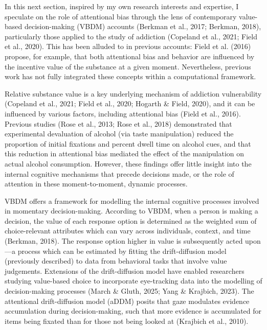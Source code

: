 \documentclass[authordate, empirical]{jote-new-article}
\begin{document}
	In this next section, inspired by my own research interests and expertise, I speculate on the role of attentional bias through the lens of contemporary value-based decision-making (VBDM) accounts (Berkman et al., 2017; Berkman, 2018), particularly those applied to the study of addiction (Copeland et al., 2021; Field et al., 2020). This has been alluded to in previous accounts: Field et al. (2016) propose, for example, that both attentional bias and behavior are influenced by the incentive value of the substance at a given moment. Nevertheless, previous work has not fully integrated these concepts within a computational framework.



	Relative substance value is a key underlying mechanism of addiction vulnerability (Copeland et al., 2021; Field et al., 2020; Hogarth \& Field, 2020), and it can be influenced by various factors, including attentional bias (Field et al., 2016). Previous studies (Rose et al., 2013; Rose et al., 2018) demonstrated that experimental devaluation of alcohol (via taste manipulation) reduced the proportion of initial fixations and percent dwell time on alcohol cues, and that this reduction in attentional bias mediated the effect of the manipulation on actual alcohol consumption. However, these findings offer little insight into the internal cognitive mechanisms that precede decisions made, or the role of attention in these moment-to-moment, dynamic processes.



	VBDM offers a framework for modelling the internal cognitive processes involved in momentary decision-making. According to VBDM, when a person is making a decision, the value of each response option is determined as the weighted sum of choice-relevant attributes which can vary across individuals, context, and time (Berkman, 2018). The response option higher in value is subsequently acted upon—a process which can be estimated by fitting the drift-diffusion model (previously described) to data from behavioral tasks that involve value judgements. Extensions of the drift-diffusion model have enabled researchers studying value-based choice to incorporate eye-tracking data into the modelling of decision-making processes (March \& Gluth, 2025; Yang \& Krajbich, 2023). The attentional drift-diffusion model (aDDM) posits that gaze modulates evidence accumulation during decision-making, such that more evidence is accumulated for items being fixated than for those not being looked at (Krajbich et al., 2010).
\end{document}
